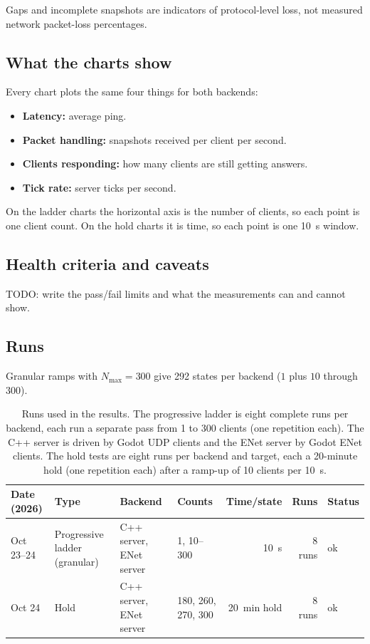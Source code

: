 Gaps and incomplete snapshots are indicators of protocol-level loss, not
measured network packet-loss percentages.


\subsection{What the charts show}
Every chart plots the same four things for both backends:

\begin{itemize}
\item \textbf{Latency:} average ping.
\item \textbf{Packet handling:} snapshots received per client per second.
\item \textbf{Clients responding:} how many clients are still getting answers.
\item \textbf{Tick rate:} server ticks per second.
\end{itemize}

On the ladder charts the horizontal axis is the number of clients, so each point is one client count. On the hold charts it is time, so each point is one 10~s window.


\subsection{Health criteria and caveats}
TODO: write the pass/fail limits and what the measurements can and cannot show.

\subsection{Runs}

Granular ramps with $N_{\max}=300$ give 292 states per backend
($1$ plus $10$ through $300$).

\begin{table}[H]
\centering
\footnotesize
\setlength{\tabcolsep}{3pt}
\begin{tabular}{@{}llllrrl@{}}
\toprule
Date (2026) & Type & Backend & Counts & Time/state & Runs & Status \\
\midrule
Oct 23--24 & Progressive ladder (granular) & C++ server, ENet server & 1, 10--300 & 10~s & 8 runs & ok \\
Oct 24 & Hold & C++ server, ENet server & 180, 260, 270, 300 & 20~min hold & 8 runs & ok \\
\bottomrule
\end{tabular}
\caption{Runs used in the results. The progressive ladder is eight complete runs per backend, each run a separate pass from 1 to 300 clients (one repetition each). The C++ server is driven by Godot UDP clients and the ENet server by Godot ENet clients. The hold tests are eight runs per backend and target, each a 20-minute hold (one repetition each) after a ramp-up of 10 clients per 10~s.}
\end{table}


